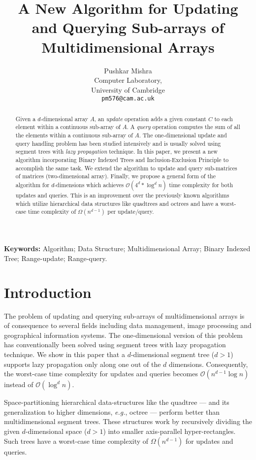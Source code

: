 \documentclass[a4paper]{article}
\title{\textbf{A New Algorithm for Updating and Querying Sub-arrays of Multidimensional Arrays}}
\author{Pushkar Mishra\\
Computer Laboratory,\\
University of Cambridge\\
\texttt{pm576@cam.ac.uk}}
\date{\vspace{-7 mm}}
\begin{document}
\maketitle
\begin{abstract}
Given a $d$-dimensional array $A$, an \textit{update} operation adds a given constant $C$ to each element within a continuous sub-array of $A$. A \textit{query} operation computes the sum of all the elements within a continuous sub-array of $A$. The one-dimensional update and query handling problem has been studied intensively and is usually solved using segment trees with \textit{lazy propagation} technique. In this paper, we present a new algorithm incorporating Binary Indexed Trees and Inclusion-Exclusion Principle to accomplish the same task. We extend the algorithm to update and query sub-matrices of matrices (two-dimensional array). Finally, we propose a general form of the algorithm for $d$-dimensions which achieves $\mathcal{O}(4^d*\log^{d}n)$ time complexity for both updates and queries. This is an improvement over the previously known algorithms which utilize hierarchical data structures like quadtrees and octrees and have a worst-case time complexity of $\Omega(n^{d-1})$ per update/query.
\end{abstract}

\smallskip
\noindent
\textbf{Keywords:} Algorithm; Data Structure; Multidimensional Array; Binary Indexed Tree; Range-update; Range-query.


\section{Introduction}
The problem of updating and querying sub-arrays of multidimensional arrays is of consequence to several fields including data management, image processing and geographical information systems. The one-dimensional version of this problem has conventionally been solved using segment trees with lazy propagation technique. We show in this paper that a $d$-dimensional segment tree ($d > 1$) supports lazy propagation only along one out of the $d$ dimensions. Consequently, the worst-case time complexity for updates and queries becomes $\mathcal{O}(n^{d-1}\log n)$ instead of $\mathcal{O}(\log^{d}n)$.

\vspace{2 mm}
Space-partitioning hierarchical data-structures like the quadtree --- and its generalization to higher dimensions, \textit{e.g.}, octree --- perform better than multidimensional segment trees.\cite{HS1} These structures work by recursively dividing the given $d$-dimensional space ($d > 1$) into smaller axis-parallel hyper-rectangles. Such trees have a worst-case time complexity of $\Omega(n^{d-1})$ for updates and queries.
\end{document}
